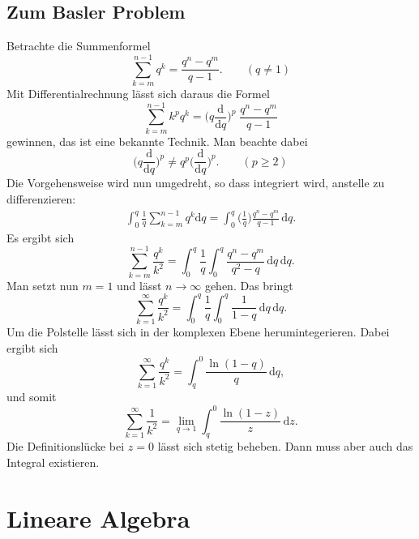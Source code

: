 \documentclass[a4paper,10pt,fleqn,twocolumn,twoside]{scrartcl}
\numberwithin{equation}{section}
\begin{document}
\subsection{Zum Basler Problem}
Betrachte die Summenformel
\begin{equation}
\sum_{k=m}^{n-1} q^k = \frac{q^n-q^m}{q-1}.\qquad (q\ne 1)
\end{equation}
Mit Differentialrechnung lässt sich daraus die Formel
\begin{equation}
\sum_{k=m}^{n-1} k^p q^k 
= \Big(q\frac{\mathrm d}{\mathrm dq}\Big)^p\;\frac{q^n-q^m}{q-1}
\end{equation}
gewinnen, das ist eine bekannte Technik. Man beachte dabei
\begin{equation}
\Big(q\frac{\mathrm d}{\mathrm dq}\Big)^p
\ne q^p \Big(\frac{\mathrm d}{\mathrm dq}\Big)^p.\qquad (p\ge 2)
\end{equation}
Die Vorgehensweise wird nun umgedreht, so dass integriert wird,
anstelle zu differenzieren:
\begin{gather}
\int_0^q \frac{1}{q}\sum_{k=m}^{n-1} q^k \mathrm dq = \int_0^q\bigg(\frac{1}{q}\bigg)\frac{q^n-q^m}{q-1}\,\mathrm dq.
\end{gather}
Es ergibt sich
\begin{equation}
\sum_{k=m}^{n-1}\frac{q^k}{k^2} = \int_0^q\frac{1}{q}\int_0^q\frac{q^n-q^m}{q^2-q}\,\mathrm dq\,\mathrm dq.
\end{equation}
Man setzt nun $m=1$ und lässt $n\to\infty$ gehen.
Das bringt%
\begin{equation}
\sum_{k=1}^\infty\frac{q^k}{k^2} = \int_0^q\frac{1}{q}\int_0^q\frac{1}{1-q}\,\mathrm dq\,\mathrm dq.
\end{equation}
Um die Polstelle lässt sich in der komplexen Ebene herumintegerieren.
Dabei ergibt sich
\begin{equation}
\sum_{k=1}^\infty\frac{q^k}{k^2} = \int_q^0 \frac{\ln(1-q)}{q}\,\mathrm dq,
\end{equation}
und somit
\begin{equation}
\sum_{k=1}^\infty\frac{1}{k^2} = \lim_{q\to 1}\int_q^0 \frac{\ln(1-z)}{z}\,\mathrm dz.
\end{equation}
Die Definitionslücke bei $z=0$ lässt sich stetig beheben. Dann muss
aber auch das Integral existieren.

\newpage
\section{Lineare Algebra}
\end{document}
